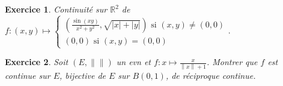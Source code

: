 \documentclass[12pt,a4paper]{article}
\newcommand{\norme}[1]{\left\lVert#1\right\rVert}
\newcommand{\R}{\mathbb{R}}
\newcommand{\Q}{\mathbb{Q}}
\newcommand{\Z}{\mathbb{Z}}
\theoremstyle{break}
\theoremstyle{break}
\newtheorem{Exo}{Exercice}
\begin{document}
%	


\begin{Exo}
	Continuité sur $\R^2$ de $f:(x,y)\mapsto\begin{cases}
		\left(\frac{\sin(xy)}{x^2+y^2},\sqrt{|x|+|y|}\right)\text{ si }(x,y)\neq (0,0)\\ (0,0)\text{ si }(x,y)=(0,0)
	\end{cases}.$
\end{Exo}
%
%	


\begin{Exo}
	 Soit $(E,\norme{})$ un evn et $f:x\mapsto \frac{x}{\norme{x}+1}$. Montrer que $f$ est continue sur $E$, bijective de $E$ sur $B(0,1)$, de réciproque continue.
\end{Exo}
\end{document}
